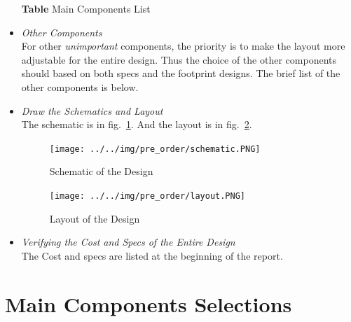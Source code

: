 \documentclass[]{article}
\begin{document}
\begin{itemize}
            \begin{center}
                \textbf{Table} Main Components List 
            \end{center}

        \item \textit{Other Components} \\
            For other \textit{unimportant} components, the priority is to make
            the layout more adjustable for the entire design. Thus the choice of
            the other components should based on both specs and the footprint
            designs. The brief list of the other components is below.

        \item \textit{Draw the Schematics and Layout} \\
            The schematic is in fig.~\ref{schematic}. And the layout is in
            fig.~\ref{layout}.
            \begin{figure}[p]
                \begin{center}
                    \vspace{-0.3in}
                    \texttt{[image: ../../img/pre\_order/schematic.PNG]}~
                    \label{schematic}
                    \caption{Schematic of the Design}
                \end{center}
            \end{figure}

            \begin{figure}[p]
                \begin{center}
                    \texttt{[image: ../../img/pre\_order/layout.PNG]}~
                    \label{layout}
                    \caption{Layout of the Design}
                \end{center}
            \end{figure}
            
        \item \textit{Verifying the Cost and Specs of the Entire Design} \\
            The Cost and specs are listed at the beginning of the report.

    \end{itemize}

\section{Main Components Selections}
\end{document}
